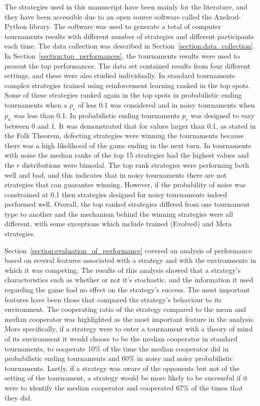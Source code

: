 \documentclass{article}
\newcommand{\numberofalltournaments}{}
\newcommand{\numberofstrategies}{}
\begin{document}
The \numberofstrategies strategies used in this manuscript have been mainly for
the literature, and they have been accessible due to an open source software
called the Axelrod-Python library. The software was used to generate a total of
\numberofalltournaments computer tournaments results with different number of
strategies and different participants each time. The data collection was
described in Section~\ref{section:data_collection}. In
Section~\ref{section:top_performances}, the tournaments results were used to
present the top performances. The data set contained results from four different
settings, and these were also studied individually. In standard tournaments
complex strategies trained using reinforcement learning ranked in the top spots.
Some of these strategies ranked again in the top spots in probabilistic
ending tournaments when a \(p_e\) of less 0.1 was considered and in noisy tournaments
when \(p_n\) was less than 0.1. In probabilistic
ending tournaments \(p_e\) was designed to vary between 0 and 1. It was demonstrated
that for values larger than 0.1, as stated in the Folk Theorem, defecting strategies
were winning the tournaments because there was a high likelihood of the game
ending in the next turn. In tournaments with noise the median ranks of the top
15 strategies had the highest values and the \(r\) distributions were bimodal.
The top rank strategies were performing both well and bad, and this indicates
that in noisy tournaments there are not strategies that can guarantee winning.
However, if the probability of noise was constrained at 0.1 then strategies
designed for noisy tournaments indeed performed well.
Overall, the top ranked strategies differed from one tournament type to
another and the mechanism behind the winning strategies were all different, with some
exceptions which include trained (Evolved) and Meta strategies.

Section~\ref{section:evaluation_of_performance} covered an analysis of
performance based on several features associated with a strategy and with the
environments in which it was competing. The results of this analysis showed that a
strategy's characteristics such as whether or not it's stochastic, and the information it
used regarding the game had no effect on the strategy's success. The most
important features have been those that compared the strategy's behaviour to its
environment. The cooperating ratio of the strategy compared to the mean and
median cooperator was highlighted as the most important feature in the analysis.
More specifically, if a strategy were to enter a tournament with a theory of
mind of its environment it would choose to be the median cooperator in standard
tournaments, to cooperate 10\% of the time the median cooperator did in probabilistic ending tournaments and 
60\% in noisy and noisy probabilistic
tournaments. Lastly, if a strategy was aware of the opponents but not of the
setting of the tournament, a strategy would be more likely to be successful if
it were to identify the median cooperator and cooperated 67\% of the times that
they did.
\end{document}
